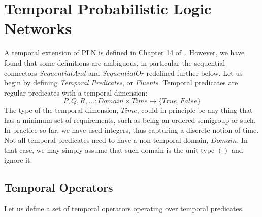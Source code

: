 \documentclass[runningheads]{llncs}
\newcommand{\TTrue}{\textit{True}}
\newcommand{\TFalse}{\textit{False}}
\newcommand{\TTime}{\textit{Time}}
\newcommand{\TSeqAnd}{\textit{SequentialAnd}}
\newcommand{\TSeqOr}{\textit{SequentialOr}}
\begin{document}
\section{Temporal Probabilistic Logic Networks}
\label{sec:temporal}
A temporal extension of PLN is defined in Chapter 14
of~\cite{Goertzel09PLN}.  However, we have found that some definitions
are ambiguous, in particular the sequential connectors $\TSeqAnd$ and
$\TSeqOr$ redefined further below. %
Let us begin by defining \emph{Temporal Predicates}, or
\emph{Fluents}.  Temporal predicates are regular predicates with a
temporal dimension:
$$P, Q, R, \hdots: \textit{Domain} \times \TTime \mapsto \{\TTrue,
\TFalse\}$$
\noindent The type of the temporal dimension, $\TTime$, could in
principle be any thing that has a minimum set of requirements, such as
being an ordered semigroup or such.  In practice so far, we have used
integers, thus capturing a discrete notion of time.  Not all temporal
predicates need to have a non-temporal domain, $\textit{Domain}$.  In
that case, we may simply assume that such domain is the unit type $()$
and ignore it.

\subsection{Temporal Operators}
Let us define a set of temporal operators operating over temporal
predicates.
\end{document}

